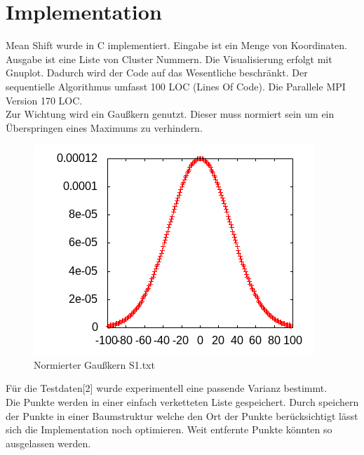 \section{Implementation}
	Mean Shift wurde in C implementiert. 
	Eingabe ist ein Menge von Koordinaten. Ausgabe ist eine Liste von Cluster Nummern. Die Visualisierung erfolgt mit Gnuplot.
	Dadurch wird der Code auf das Wesentliche beschränkt.
	Der sequentielle Algorithmus umfasst 100 LOC (Lines Of Code). Die Parallele MPI Version 170 LOC.\\
	Zur Wichtung wird ein Gaußkern genutzt. Dieser muss normiert sein um ein Überspringen eines Maximums zu verhindern.\\
	\vspace{-10pt}
	\begin{figure}[H]
		\centering
		\includegraphics[scale=0.7]{../meanshift/output/pics/gauss.png} 
		\caption{Normierter Gaußkern S1.txt}
	\end{figure}
	Für die Testdaten[2] wurde experimentell eine passende Varianz bestimmt.\\
	Die Punkte werden in einer einfach verketteten Liste gespeichert. Durch speichern der Punkte in einer Baumstruktur welche den Ort der
	Punkte berücksichtigt lässt sich die Implementation noch optimieren. Weit entfernte Punkte könnten so ausgelassen werden.\\
